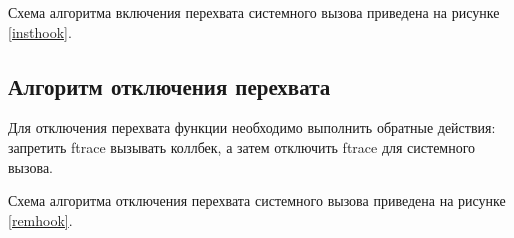 Схема алгоритма включения перехвата системного вызова приведена на рисунке \ref{insthook}.

\begin{figure}[H]
\end{figure}

\subsection{Алгоритм отключения перехвата}

Для отключения перехвата функции необходимо выполнить обратные действия: запретить ftrace вызывать коллбек, а затем отключить ftrace для системного вызова.

Схема алгоритма отключения перехвата системного вызова приведена на рисунке \ref{remhook}.

\begin{figure}[H]
\end{figure}

